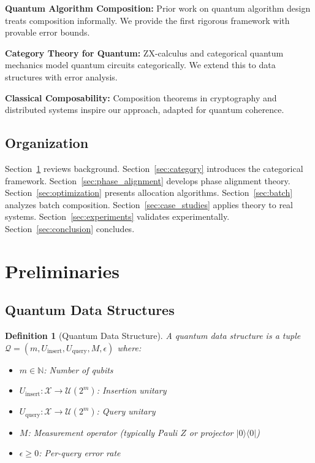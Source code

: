 \documentclass[11pt]{article}
\newtheorem{definition}{Definition}
\begin{document}
\textbf{Quantum Algorithm Composition:} Prior work on quantum algorithm design \cite{nielsen2010quantum,kitaev2002classical} treats composition informally. We provide the first rigorous framework with provable error bounds.

\textbf{Category Theory for Quantum:} ZX-calculus \cite{coecke2011interacting} and categorical quantum mechanics \cite{abramsky2004categorical} model quantum circuits categorically. We extend this to data structures with error analysis.

\textbf{Classical Composability:} Composition theorems in cryptography \cite{canetti2001universally} and distributed systems \cite{lynch1996distributed} inspire our approach, adapted for quantum coherence.

\subsection{Organization}

Section~\ref{sec:preliminaries} reviews background. Section~\ref{sec:category} introduces the categorical framework. Section~\ref{sec:phase_alignment} develops phase alignment theory. Section~\ref{sec:optimization} presents allocation algorithms. Section~\ref{sec:batch} analyzes batch composition. Section~\ref{sec:case_studies} applies theory to real systems. Section~\ref{sec:experiments} validates experimentally. Section~\ref{sec:conclusion} concludes.

\section{Preliminaries}
\label{sec:preliminaries}

\subsection{Quantum Data Structures}

\begin{definition}[Quantum Data Structure]
A quantum data structure is a tuple $\mathcal{Q} = (m, U_{\text{insert}}, U_{\text{query}}, M, \epsilon)$ where:
\begin{itemize}
\item $m \in \mathbb{N}$: Number of qubits
\item $U_{\text{insert}} : \mathcal{X} \to \mathcal{U}(2^m)$: Insertion unitary
\item $U_{\text{query}} : \mathcal{X} \to \mathcal{U}(2^m)$: Query unitary
\item $M$: Measurement operator (typically Pauli $Z$ or projector $|0\rangle\langle 0|$)
\item $\epsilon \geq 0$: Per-query error rate
\end{itemize}
\end{definition}
\end{document}
